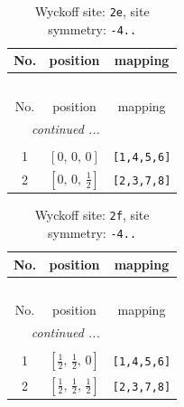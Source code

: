 \documentclass[fleqn,8pt]{jsarticle}
\begin{document}
\begin{longtable}{ccc}
\caption{Wyckoff site: {\tt 2e}, site symmetry: {\tt -4..}}
 \\
 \hline \hline
No. & position & mapping \\ \hline \endfirsthead

\multicolumn{2}{l}{\tablename\ \thetable{}} \\
 \hline \hline
No. & position & mapping \\ \hline \endhead

 \hline \hline
\multicolumn{2}{r}{\footnotesize\it continued ...} \\ \endfoot

 \hline \hline
\multicolumn{2}{r}{} \\ \endlastfoot

1 & $\left[ 0,\, 0,\, 0 \right]$ & {\tt [1,4,5,6]} \\ \hline
2 & $\left[ 0,\, 0,\, \frac{1}{2} \right]$ & {\tt [2,3,7,8]} \\
\end{longtable}
\renewcommand{\arraystretch}{1.2}
\begin{longtable}{ccc}
\caption{Wyckoff site: {\tt 2f}, site symmetry: {\tt -4..}}
 \\
 \hline \hline
No. & position & mapping \\ \hline \endfirsthead

\multicolumn{2}{l}{\tablename\ \thetable{}} \\
 \hline \hline
No. & position & mapping \\ \hline \endhead

 \hline \hline
\multicolumn{2}{r}{\footnotesize\it continued ...} \\ \endfoot

 \hline \hline
\multicolumn{2}{r}{} \\ \endlastfoot

1 & $\left[ \frac{1}{2},\, \frac{1}{2},\, 0 \right]$ & {\tt [1,4,5,6]} \\ \hline
2 & $\left[ \frac{1}{2},\, \frac{1}{2},\, \frac{1}{2} \right]$ & {\tt [2,3,7,8]} \\
\end{longtable}
\renewcommand{\arraystretch}{1.2}
\end{document}
